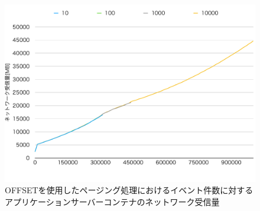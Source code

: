 \documentclass[../../../../../main]{subfiles}
\begin{document}
    \begin{figure}[H]
        \centering
        \includegraphics[width=12cm]{graph}
        \caption{OFFSETを使用したページング処理におけるイベント件数に対するアプリケーションサーバーコンテナのネットワーク受信量}
        \label{fig:paging-offset-app-net-in-app_1_1024-db_1_1024}
    \end{figure}
\end{document}
